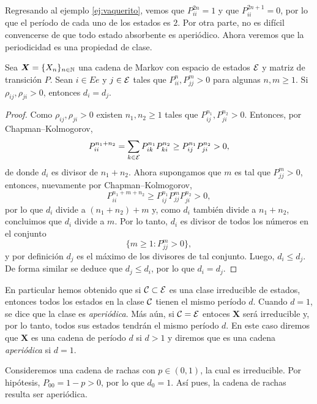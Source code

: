 Regresando al ejemplo \ref{ej:vaquerito}, vemos que $P_{ii}^{2n} = 1$ y que $P_{ii}^{2n+1} = 0$, por lo que el período de cada uno de los estados es $2$. Por otra parte, no es difícil convencerse de que todo estado absorbente es aperiódico. Ahora veremos que la periodicidad es una propiedad de clase.

\begin{proposition}
    Sea $\bm X = \{X_n\}_{n \in \mathbb{N}}$ una cadena de Markov con espacio de estados $\mathcal{E}$ y matriz de transición $P$. Sean $i \in Ee$ y $j \in \mathcal{E}$ tales que $P_{ii}^n, P_{jj}^m > 0$ para algunas $n,m \geq 1$. Si $\rho_{ij}, \rho_{ji} > 0$, entonces $d_i = d_j$.
\end{proposition}

\begin{proof}
    Como $\rho_{ij}, \rho_{ji} > 0$ existen $n_1, n_2 \geq 1$ tales que $P_{ij}^{n_1}, P_{ji}^{n_2} > 0$. Entonces, por Chapman--Kolmogorov,
    \[
        P_{ii}^{n_1+n_2} = \sum_{k \in \mathcal{E}} P_{ik}^{n_1} P_{ki}^{n_2} \geq P_{ij}^{n_1} P_{ji}^{n_2} > 0,
    \]
    de donde $d_i$ es divisor de $n_1+n_2$. Ahora supongamos que $m$ es tal que $P_{jj}^m > 0$, entonces, nuevamente por Chapman--Kolmogorov,
    \[
        P_{ii}^{n_1+m+n_2} \geq P_{ij}^{n_1} P_{jj}^m P_{ji}^{n_2} > 0,
    \]
    por lo que $d_i$ divide a $(n_1 + n_2) + m$ y, como $d_i$ también divide a $n_1 + n_2$, concluimos que $d_i$ divide a $m$. Por lo tanto, $d_i$ es divisor de todos los números en el conjunto 
    \[
        \{m \geq 1 : P_{jj}^m > 0\},
    \] y por definición $d_j$ es el máximo de los divisores de tal conjunto. Luego, $d_i \leq d_j$. De forma similar se deduce que $d_j \leq d_i$, por lo que $d_i = d_j$.
\end{proof}

En particular hemos obtenido que si $\mathcal{C} \subset \mathcal{E}$ es una clase irreducible de estados, entonces todos los estados en la clase $\mathcal{C}$ tienen el mismo período $d$. Cuando $d = 1$, se dice que la clase es \emph{aperiódica}. Más aún, si $\mathcal{C} = \mathcal{E}$ entoces $\bm X$ será irreducible y, por lo tanto, todos sus estados tendrán el mismo período $d$. En este caso diremos que $\bm X$ es una cadena de período $d$ si $d > 1$ y diremos que es una cadena \emph{aperiódica} si $d = 1$.

\begin{example}
    Consideremos una cadena de rachas con $p \in (0,1)$, la cual es irreducible. Por hipótesis, $P_{00} = 1 - p > 0$, por lo que $d_0 = 1$. Así pues, la cadena de rachas resulta ser aperiódica.
\end{example}

